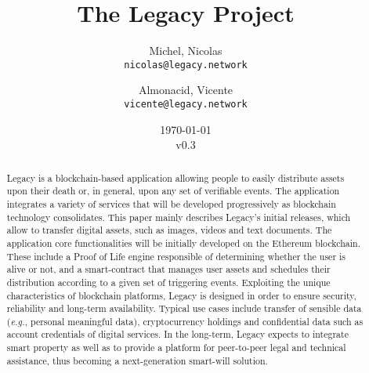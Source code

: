 \documentclass[12pt,french,english,notitlepage]{report} %
\title{The Legacy Project}
\author{
  Michel, Nicolas\\
  \texttt{nicolas@legacy.network}
  \and
  Almonacid, Vicente\\
  \texttt{vicente@legacy.network}
}
\date{\today\\v0.3}
\newcommand{\bibpath}{.}
\begin{document}

\maketitle
\begin{abstract}
    Legacy is a blockchain-based application allowing people to easily distribute assets upon their death or, in general, upon any set of verifiable events.
    The application integrates a variety of services that will be developed progressively as blockchain technology consolidates. 
    This paper mainly describes Legacy's initial releases, which allow to transfer digital assets, such as images, videos and text documents. 
    The application core functionalities will be initially developed on the Ethereum blockchain. These include a Proof of Life engine responsible of determining whether the user is alive or not, and a smart-contract that manages user assets and schedules their distribution according to a given set of triggering events.
    Exploiting the unique characteristics of blockchain platforms, Legacy is designed in order to ensure security, reliability and long-term availability. 
    Typical use cases include transfer of sensible data (\textit{e.g.}, personal meaningful data), cryptocurrency holdings and confidential data such as account credentials of digital services. 
    In the long-term, Legacy expects to integrate smart property as well as to provide a platform for peer-to-peer legal and technical assistance, thus becoming a next-generation smart-will solution.

\end{abstract}



\tableofcontents




%



%

%
%



%
%
%
%
\printbibliography
\end{document}
